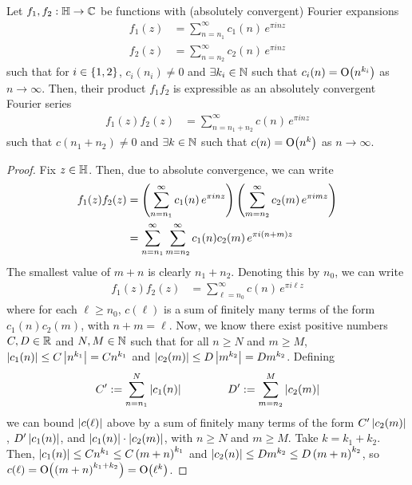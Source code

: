\begin{boxproposition}\label{Ch4:Prop:PolyGrowth_of_mul}
    Let $f_1, f_2 : \mathbb{H} \to \mathbb{C}$ be functions with (absolutely convergent) Fourier expansions
    \begin{align*}
        f_1(z) &= \sum_{n=n_1}^{\infty} c_1(n) \, e^{\pi i n z} \\
        f_2(z) &= \sum_{n=n_2}^{\infty} c_2(n) \, e^{\pi i n z}
    \end{align*}
    such that for $i \in \left\{ 1, 2 \right\}$, $c_i(n_i) \neq 0$ and $\exists k_i \in \mathbb{N}$ such that $c_i(n) = \operatorname{O}\!\left( n^{k_i} \right)$ as $n \to \infty$. Then, their product $f_1 f_2$ is expressible as an absolutely convergent Fourier series
    \begin{align*}
        f_1(z) f_2(z) &= \sum_{n = n_1 + n_2}^{\infty} c(n) \, e^{\pi i n z}
    \end{align*}
    such that $c(n_1 + n_2) \neq 0$ and $\exists k \in \mathbb{N}$ such that $c(n) = \operatorname{O}\!\left( n^k \right)$ as $n \to \infty$.
\end{boxproposition}
\begin{proof}
    Fix $z \in \mathbb{H}$. Then, due to absolute convergence, we can write
    \begin{align*}
        f_1(z) f_2(z) &= \left( \sum_{n=n_1}^{\infty} c_1(n) \, e^{\pi i n z} \right) \left( \sum_{m=n_2}^{\infty} c_2(m) \, e^{\pi i m z} \right) \\
        &= \sum_{n = n_1}^{\infty} \sum_{m = n_2}^{\infty} c_1(n) c_2(m) \, e^{\pi i \left( n + m \right) z}
    \end{align*}
    The smallest value of $m + n$ is clearly $n_1 + n_2$. Denoting this by $n_0$, we can write
    \begin{align*}
        f_1(z) f_2(z) &= \sum_{\ell = n_0}^{\infty} c(n) \, e^{\pi i \ell z}
    \end{align*}
    where for each $\ell \geq n_0$, $c(\ell)$ is a sum of finitely many terms of the form $c_1(n) c_2(m)$, with $n + m = \ell$. Now, we know there exist positive numbers $C, D \in \mathbb{R}$ and $N, M \in \mathbb{N}$ such that for all $n \geq N$ and $m \geq M$, $\left\lvert c_1(n) \right\rvert \leq C \left\lvert n^{k_1} \right\rvert = C n^{k_1}$ and $\left\lvert c_2(m) \right\rvert \leq D \left\lvert m^{k_2} \right\rvert = D m^{k_2}$. Defining
    \begin{align*}
        C' := \sum_{n=n_1}^{N} \left\lvert c_1(n) \right\rvert
        \qquad \qquad
        D' := \sum_{m=n_2}^{M} \left\lvert c_2(m) \right\rvert
    \end{align*}
    we can bound $\left\lvert c(\ell) \right\rvert$ above by a sum of finitely many terms of the form $C' \left\lvert c_2(m) \right\rvert$, $D' \left\lvert c_1(n) \right\rvert$, and $\left\lvert c_1(n) \right\rvert \cdot \left\lvert c_2(m) \right\rvert$, with $n \geq N$ and $m \geq M$. Take $k = k_1 + k_2$. Then, $\left\lvert c_1(n) \right\rvert \leq C n^{k_1} \leq C \left( m+n \right)^{k_1}$ and $\left\lvert c_2(n) \right\rvert \leq D m^{k_2} \leq D \left( m+n \right)^{k_2}$, so $c(\ell) = \operatorname{O}\!\left( \left( m+n \right)^{k_1 + k_2} \right) = \operatorname{O}\!\left( \ell^k \right)$. %
\end{proof}

